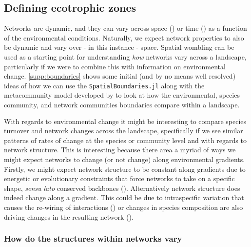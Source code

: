 \begin{refsection}
\subsection{Defining ecotrophic zones}\label{Defining-ecotrophic-zones}

Networks are dynamic, and they can vary across space (\cite{Golubski2016EcoNet, Vazquez2007SpeAbu}) or time (\cite{Poisot2015Species, Trojelsgaard2016EcoNet}) as a function of the environmental conditions. Naturally, we expect network properties to also be dynamic and vary over - in this instance - space. Spatial wombling can be used as a starting point for understanding \emph{how} networks vary across a landscape, particularly if we were to combine this with information on environmental change. \autoref{supp:boundaries} shows some initial (and by no means well resolved) ideas of how we can use the \texttt{SpatialBoundaries.jl} along with the metacommunity model developed by \cite{Thompson2017Dispersal} to look at how the environmental, species community, and network communities boundaries compare within a landscape.

With regards to environmental change it might be interesting to compare species turnover and network changes across the landscape, specifically if we see similar patterns of rates of change at the species or community level and with regards to network structure. This is interesting because there area a myriad of ways we might expect networks to change (or not change) along environmental gradients. Firstly, we might expect network structure to be constant along gradients due to energetic or evolutionary constraints that force networks to take on a specific shape, \emph{sensu lato} conserved backbones (\cite{BramonMora2018Identifying}). Alternatively network structure does indeed change along a gradient. This could be due to intraspecific variation that causes the re-wiring of interactions (\cite{Bolnick2011WhyInt}) or changes in species composition are also driving changes in the resulting network (\cite{Martins2022Global}).

\subsubsection{How do the structures within networks vary}


\end{refsection}
